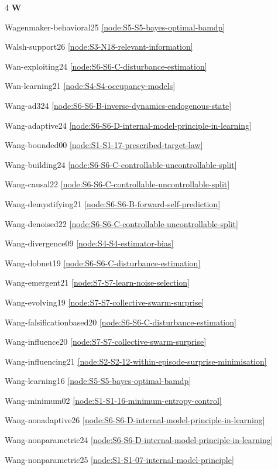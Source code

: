 \documentclass[10pt]{article}
\begin{document}
{\begin{multicols}{4}
\smallskip\textbf{W}\par
Wagenmaker-behavioral25 \hfill \ref{node:S5-S5-bayes-optimal-bamdp}\par
Walsh-support26 \hfill \ref{node:S3-N18-relevant-information}\par
Wan-exploiting24 \hfill \ref{node:S6-S6-C-disturbance-estimation}\par
Wan-learning21 \hfill \ref{node:S4-S4-occupancy-models}\par
Wang-ad324 \hfill \ref{node:S6-S6-B-inverse-dynamics-endogenous-state}\par
Wang-adaptive24 \hfill \ref{node:S6-S6-D-internal-model-principle-in-learning}\par
Wang-bounded00 \hfill \ref{node:S1-S1-17-prescribed-target-law}\par
Wang-building24 \hfill \ref{node:S6-S6-C-controllable-uncontrollable-split}\par
Wang-causal22 \hfill \ref{node:S6-S6-C-controllable-uncontrollable-split}\par
Wang-demystifying21 \hfill \ref{node:S6-S6-B-forward-self-prediction}\par
Wang-denoised22 \hfill \ref{node:S6-S6-C-controllable-uncontrollable-split}\par
Wang-divergence09 \hfill \ref{node:S4-S4-estimator-bias}\par
Wang-dobnet19 \hfill \ref{node:S6-S6-C-disturbance-estimation}\par
Wang-emergent21 \hfill \ref{node:S7-S7-learn-noise-selection}\par
Wang-evolving19 \hfill \ref{node:S7-S7-collective-swarm-surprise}\par
Wang-falsificationbased20 \hfill \ref{node:S6-S6-C-disturbance-estimation}\par
Wang-influence20 \hfill \ref{node:S7-S7-collective-swarm-surprise}\par
Wang-influencing21 \hfill \ref{node:S2-S2-12-within-episode-surprise-minimisation}\par
Wang-learning16 \hfill \ref{node:S5-S5-bayes-optimal-bamdp}\par
Wang-minimum02 \hfill \ref{node:S1-S1-16-minimum-entropy-control}\par
Wang-nonadaptive26 \hfill \ref{node:S6-S6-D-internal-model-principle-in-learning}\par
Wang-nonparametric24 \hfill \ref{node:S6-S6-D-internal-model-principle-in-learning}\par
Wang-nonparametric25 \hfill \ref{node:S1-S1-07-internal-model-principle}\par

\end{multicols}}
\end{document}

